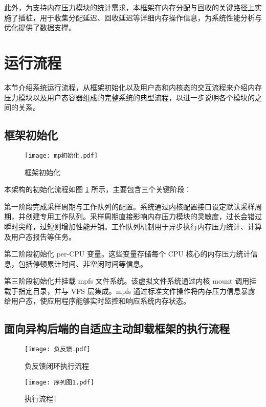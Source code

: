 此外，为支持内存压力模块的统计需求，本框架在内存分配与回收的关键路径上实施了插桩，用于收集分配延迟、回收延迟等详细内存操作信息，为系统性能分析与优化提供了数据支撑。


\section{运行流程}

本节介绍系统运行流程，从框架初始化以及用户态和内核态的交互流程来介绍内存压力模块以及用户态容器组成的完整系统的典型流程，以进一步说明各个模块的之间的关系。

\subsection{框架初始化}

\begin{figure}[h]
    \centering
    \texttt{[image: mp初始化.pdf]}
    \caption{框架初始化}
    \label{fig:framework_initialization}
\end{figure}

本架构的初始化流程如图 \ref{fig:framework_initialization} 所示，主要包含三个关键阶段：

第一阶段完成采样周期与工作队列的配置。系统通过内核配置接口设定默认采样周期，并创建专用工作队列。采样周期直接影响内存压力模块的灵敏度，过长会错过瞬时尖峰，过短则增加性能开销。工作队列机制用于异步执行内存压力统计、计算及用户态报告等任务。

第二阶段初始化 per-CPU 变量。这些变量存储每个 CPU 核心的内存压力统计信息，包括停顿累计时间、非空闲时间等信息。

第三阶段初始化并挂载 mpfs 文件系统。该虚拟文件系统通过内核 mount 调用挂载于指定目录，并与 VFS 层集成。mpfs 通过标准文件操作将内存压力信息暴露给用户态，使应用程序能够实时监控和响应系统内存状态。

\subsection{面向异构后端的自适应主动卸载框架的执行流程}
\label{sec:面向异构后端的自适应主动卸载框架的执行流程}




\begin{figure}[h]
\centering
\texttt{[image: 负反馈.pdf]}
\caption{负反馈闭环执行流程}
\label{fig:feedback_loop}
\end{figure}

\begin{figure}[h]
\centering
\texttt{[image: 序列图1.pdf]}
\caption{执行流程1}
\label{fig:kernel_sequence_diagram_1}
\end{figure}


